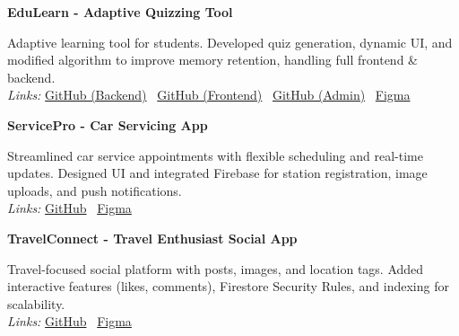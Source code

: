 
\vspace{2pt}
\noindent\textbf{EduLearn - Adaptive Quizzing Tool}\\[2pt]
{\small Adaptive learning tool for students. Developed quiz generation, dynamic UI, and modified algorithm to improve memory retention, handling full frontend \& backend.\\
\textit{Links:} {\footnotesize\href{https://github.com/example}{GitHub (Backend)} \textbar\ \href{https://github.com/example}{GitHub (Frontend)} \textbar\ \href{https://github.com/example}{GitHub (Admin)} \textbar\ \href{https://figma.com/example}{Figma}}\\[1pt]
\par}

\vspace{6pt}
\noindent\textbf{ServicePro - Car Servicing App}\\[2pt]
{\small Streamlined car service appointments with flexible scheduling and real-time updates. Designed UI and integrated Firebase for station registration, image uploads, and push notifications.\\
\textit{Links:} {\footnotesize\href{https://github.com/example}{GitHub} \textbar\ \href{https://figma.com/example}{Figma}}\\[1pt]
\par}

\vspace{6pt}
\noindent\textbf{TravelConnect - Travel Enthusiast Social App}\\[2pt]
{\small Travel-focused social platform with posts, images, and location tags. Added interactive features (likes, comments), Firestore Security Rules, and indexing for scalability.\\
\textit{Links:} {\footnotesize\href{https://github.com/example}{GitHub} \textbar\ \href{https://figma.com/example}{Figma}}\\[1pt]
\par}